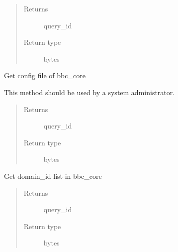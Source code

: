 \documentclass[letterpaper,10pt,english]{sphinxmanual}
\begin{document}
\begin{fulllineitems}
\begin{fulllineitems}
\begin{quote}
\begin{description}
\item[{Returns}] \leavevmode
query\_id

\item[{Return type}] \leavevmode
bytes

\end{description}\end{quote}

\end{fulllineitems}


\begin{fulllineitems}
\label{\detokenize{bbc1.core.bbc_app:bbc1.core.bbc_app.BBcAppClient.get_bbc_config}}
Get config file of bbc\_core

This method should be used by a system administrator.
\begin{quote}\begin{description}
\item[{Returns}] \leavevmode
query\_id

\item[{Return type}] \leavevmode
bytes

\end{description}\end{quote}

\end{fulllineitems}


\begin{fulllineitems}
\label{\detokenize{bbc1.core.bbc_app:bbc1.core.bbc_app.BBcAppClient.get_domain_list}}
Get domain\_id list in bbc\_core
\begin{quote}\begin{description}
\item[{Returns}] \leavevmode
query\_id

\item[{Return type}] \leavevmode
bytes

\end{description}\end{quote}

\end{fulllineitems}



\end{fulllineitems}
\end{document}
